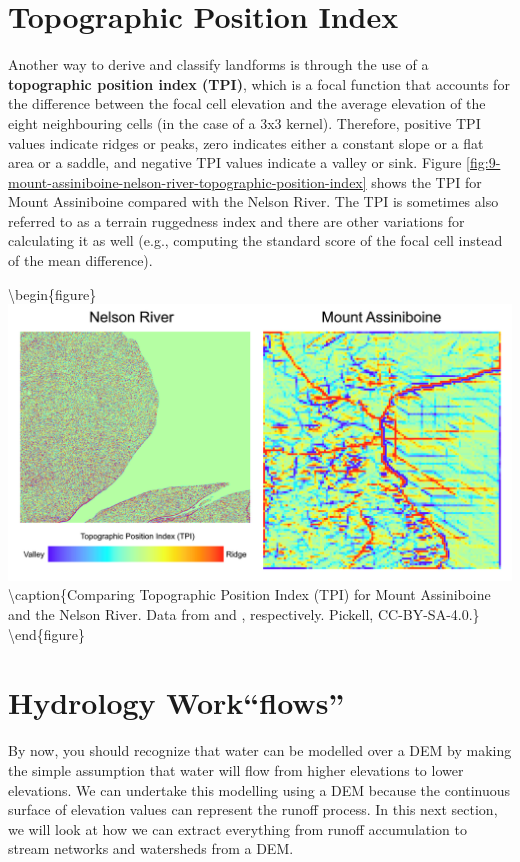 \documentclass[
]{book}
\begin{document}
\hypertarget{topographic-position-index}{%
\section{Topographic Position Index}\label{topographic-position-index}}

Another way to derive and classify landforms is through the use of a \textbf{topographic position index (TPI)}, which is a focal function that accounts for the difference between the focal cell elevation and the average elevation of the eight neighbouring cells (in the case of a 3x3 kernel). Therefore, positive TPI values indicate ridges or peaks, zero indicates either a constant slope or a flat area or a saddle, and negative TPI values indicate a valley or sink. Figure \ref{fig:9-mount-assiniboine-nelson-river-topographic-position-index} shows the TPI for Mount Assiniboine compared with the Nelson River. The TPI is sometimes also referred to as a terrain ruggedness index and there are other variations for calculating it as well (e.g., computing the standard score of the focal cell instead of the mean difference).

\textbackslash begin\{figure\}
\includegraphics[width=0.75\linewidth]{images/09-mount-assiniboine-nelson-river-topographic-position-index} \textbackslash caption\{Comparing Topographic Position Index (TPI) for Mount Assiniboine and the Nelson River. Data from \citet{natural_resources_canada_canadian_2015} and \citet{maxar_precision3d_nodate}, respectively. Pickell, CC-BY-SA-4.0.\}\label{fig:9-mount-assiniboine-nelson-river-topographic-position-index}
\textbackslash end\{figure\}

\hypertarget{hydrology-workflows}{%
\section{Hydrology Work``flows''}\label{hydrology-workflows}}

By now, you should recognize that water can be modelled over a DEM by making the simple assumption that water will flow from higher elevations to lower elevations. We can undertake this modelling using a DEM because the continuous surface of elevation values can represent the runoff process. In this next section, we will look at how we can extract everything from runoff accumulation to stream networks and watersheds from a DEM.
\end{document}
